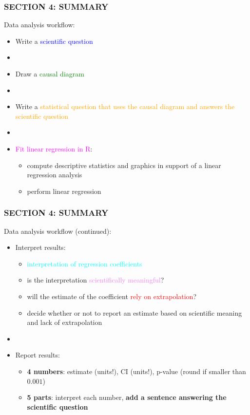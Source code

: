 \documentclass[12pt, 
hyperref={colorlinks=true, linkcolor=blue, urlcolor=cyan},dvipsnames]{beamer}
\begin{document}
\begin{frame}
\frametitle{SECTION 4: SUMMARY}
Data analysis workflow: \vspace{-0.3cm}
\begin{itemize}
\item Write a \textcolor{blue}{scientific question}
\item[]
\item Draw a \textcolor{green}{causal diagram}
\item[]
\item Write a \textcolor{orange}{statistical question that uses the causal diagram and answers the scientific question}
\item[]
\item \textcolor{magenta}{Fit linear regression in R}:
\begin{itemize}
\item compute descriptive statistics and graphics in support of a linear regression analysis
\item perform linear regression
\end{itemize}
\end{itemize}
\end{frame}

\begin{frame}
\frametitle{SECTION 4: SUMMARY}
Data analysis workflow (continued): \vspace{-0.3cm}
\begin{itemize}
\item Interpret results:
\begin{itemize}
\item \textcolor{cyan}{interpretation of regression coefficients}
\item is the interpretation \textcolor{violet}{scientifically meaningful}?
\item will the estimate of the coefficient \textcolor{red}{rely on extrapolation}?
\item decide whether or not to report an estimate based on scientific meaning and lack of extrapolation
\end{itemize}
\item[]
\item Report results:
\begin{itemize}
\item \textbf{4 numbers}: estimate (units!), CI (units!), p-value (round if smaller than $0.001$)
\item \textbf{5 parts}: interpret each number, \textbf{add a sentence answering the scientific question}
\end{itemize}
\end{itemize}
\end{frame}
\end{document}
